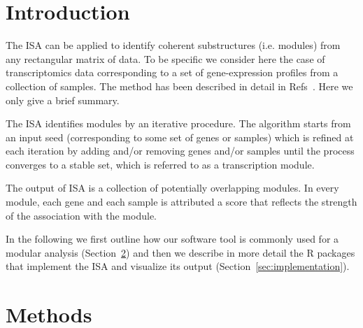 \documentclass{bioinfo}
\begin{document}
\section{Introduction}

The ISA can be applied to identify coherent substructures (i.e. modules)
from any rectangular matrix of data. To be specific we consider here the
case of transcriptomics data corresponding to a set of gene-expression
profiles from a collection of samples. The method has been described in
detail in Refs~\citep{isamod,isa}. Here we only give a brief summary.

The ISA identifies modules by an iterative procedure. The algorithm starts
from an input seed (corresponding to some set of genes or samples) which is
refined at each iteration by adding and/or removing genes and/or samples
until the process converges to a stable set, which is referred to as a
transcription module.

The output of ISA is a collection of potentially overlapping
modules. In every module, each gene and each sample is attributed a
score that reflects the strength of the association with the module.

In the following we first outline how our software tool is commonly used for a
modular analysis (Section~\ref{sec:methods}) and then we describe in more
detail the R packages that implement the ISA and visualize its output
(Section~\ref{sec:implementation}).

\section{Methods}%
\label{sec:methods}
\end{document}
